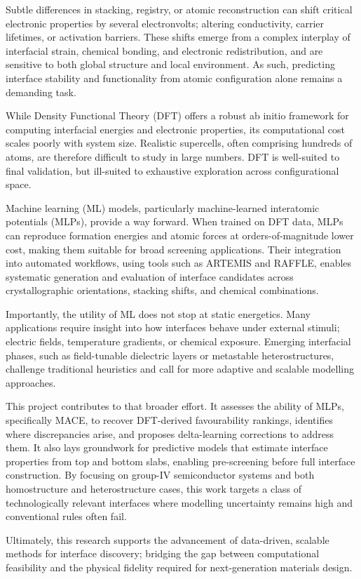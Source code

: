 Subtle differences in stacking, registry, or atomic reconstruction can shift critical electronic properties by several electronvolts; altering conductivity, carrier lifetimes, or activation barriers. These shifts emerge from a complex interplay of interfacial strain, chemical bonding, and electronic redistribution, and are sensitive to both global structure and local environment. As such, predicting interface stability and functionality from atomic configuration alone remains a demanding task. 

While Density Functional Theory (DFT) offers a robust ab initio framework for computing interfacial energies and electronic properties, its computational cost scales poorly with system size. Realistic supercells, often comprising hundreds of atoms, are therefore difficult to study in large numbers. DFT is well-suited to final validation, but ill-suited to exhaustive exploration across configurational space. 

Machine learning (ML) models, particularly machine-learned interatomic potentials (MLPs), provide a way forward. When trained on DFT data, MLPs can reproduce formation energies and atomic forces at orders-of-magnitude lower cost, making them suitable for broad screening applications. Their integration into automated workflows, using tools such as ARTEMIS and RAFFLE, enables systematic generation and evaluation of interface candidates across crystallographic orientations, stacking shifts, and chemical combinations. 

Importantly, the utility of ML does not stop at static energetics. Many applications require insight into how interfaces behave under external stimuli; electric fields, temperature gradients, or chemical exposure. Emerging interfacial phases, such as field-tunable dielectric layers or metastable heterostructures, challenge traditional heuristics and call for more adaptive and scalable modelling approaches. 

This project contributes to that broader effort. It assesses the ability of MLPs, specifically MACE, to recover DFT-derived favourability rankings, identifies where discrepancies arise, and proposes delta-learning corrections to address them. It also lays groundwork for predictive models that estimate interface properties from top and bottom slabs, enabling pre-screening before full interface construction. By focusing on group-IV semiconductor systems and both homostructure and heterostructure cases, this work targets a class of technologically relevant interfaces where modelling uncertainty remains high and conventional rules often fail. 

Ultimately, this research supports the advancement of data-driven, scalable methods for interface discovery; bridging the gap between computational feasibility and the physical fidelity required for next-generation materials design. 